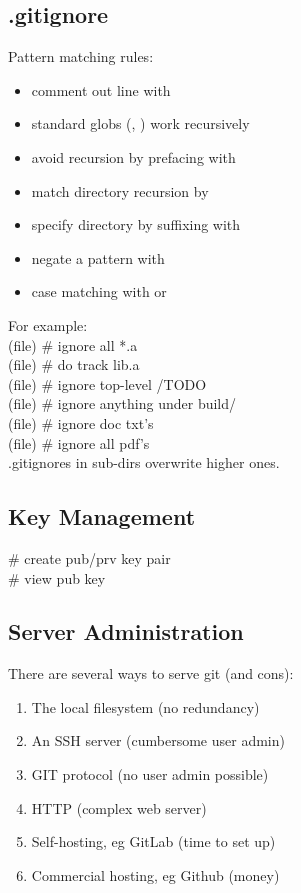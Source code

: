 \subsection*{.gitignore}
Pattern matching rules:
\begin{itemize}
    \item comment out line with \code{\#}
    \item standard globs  (\code{*}, ) work recursively
    \item avoid recursion by prefacing with \code{\textbackslash}
    \item match directory recursion by \code{**}
    \item specify directory by suffixing with \code{\textbackslash}
    \item negate a pattern with \code{!}
    \item case matching with \code{[abc]} or \code{[a-c]}
\end{itemize}
For example: \\
(file)  \# ignore all *.a \\
(file)  \# do track lib.a \\
(file)  \# ignore top-level /TODO\\
(file)  \# ignore anything under build/ \\
(file)  \# ignore doc txt's \\
(file)  \# ignore all pdf's \\
.gitignore\textquotesingle s in sub-dirs overwrite higher ones.


\subsection*{Key Management}
 \# create pub/prv key pair\\
 \# view pub key\\


\subsection*{Server Administration}
There are several ways to serve git (and cons):
\begin{enumerate}
    \item The local filesystem (no redundancy)
    \item An SSH server (cumbersome user admin)
    \item GIT protocol (no user admin possible)
    \item {} HTTP (complex web server)
    \item Self-hosting, eg GitLab (time to set up)
    \item Commercial hosting, eg Github (money)
\end{enumerate}

